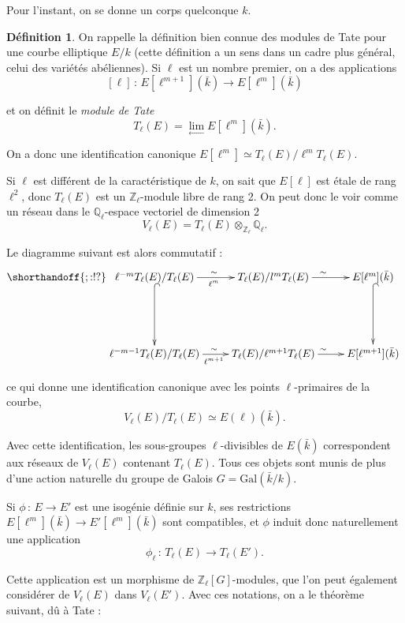 \documentclass[11pt,a4paper]{article}
\newcommand{\Z}{\mathbb{Z}}
\newcommand{\Q}{\mathbb{Q}}
\newcommand{\vers}{\longrightarrow}
\newcommand{\de}{\,:\,}
\theoremstyle{definition}
\newtheorem*{defi}{Définition}
\begin{document}
Pour l'instant, on se donne un corps quelconque $k$.

\begin{defi}

On rappelle la définition bien connue des modules de Tate pour une courbe elliptique $E/k$ (cette définition a un sens dans un cadre plus général, celui des variétés abéliennes). Si $\ell$ est un nombre premier, on a des applications
$$ [\ell] \de E[\ell^{m+1}](\bar{k})\vers E[\ell^{m}](\bar{k})$$

et on définit le \emph{module de Tate}
$$T_\ell(E) = \lim_{\leftarrow} E[\ell^m](\bar{k}).$$

On a donc une identification canonique $E[\ell^m]\simeq T_\ell(E)/ \ell^{m} T_\ell(E)$.

Si $\ell$ est différent de la caractéristique de $k$, on sait que $E[\ell]$ est étale de rang $\ell^2$, donc $T_\ell(E)$ est un $\Z_\ell$-module libre de rang 2. On peut donc le voir comme un réseau dans le $\Q_\ell$-espace vectoriel de dimension 2
$$V_\ell(E) = T_\ell(E) \otimes_{\Z_\ell} \Q_\ell.$$

Le diagramme suivant est alors commutatif :
$$
\shorthandoff{;:!?}
\xymatrix {
\ell^{-m} T_\ell(E)/ T_\ell(E) \ar[r]_{\ell^m}^{\sim} \ar@{^{(}->}[dd]&
 T_\ell(E)/ l^m T_\ell(E) \ar[r]^{\sim}  & 
 E[\ell^m](\bar{k}) \ar@{^{(}->}[dd] \\ 
 \\
 \ell^{-m-1} T_\ell(E)/ T_\ell(E) \ar[r]_{\ell^{m+1}}^{\sim} &
 T_\ell(E)/ \ell^{m+1} T_\ell(E) \ar[r]^{\sim}  & 
 E[\ell^{m+1}](\bar{k})
}
$$

ce qui donne une identification canonique avec les points $\ell$-primaires de la courbe,
$$ V_\ell(E)/ T_\ell(E) \simeq E(\ell)(\bar{k}).$$

Avec cette identification, les sous-groupes $\ell$-divisibles de $E(\bar{k})$ correspondent aux réseaux de $V_\ell(E)$ contenant $T_\ell(E)$. Tous ces objets sont munis de plus d'une action naturelle du groupe de Galois $G= \mathrm{Gal}(\bar{k}/k)$.

\end{defi}

Si $\phi\de E\vers E'$ est une isogénie définie sur $k$, ses restrictions $E[\ell^m](\bar{k})\vers E'[\ell^m](\bar{k})$ sont compatibles, et $\phi$ induit donc naturellement une application
$$ \phi_\ell\de T_\ell(E)\vers T_\ell(E').$$

Cette application est un morphisme de $\Z_\ell[G]$-modules, que l'on peut également considérer de $V_\ell(E)$ dans $V_\ell(E')$. Avec ces notations, on a le théorème suivant, dû à Tate :
\end{document}
